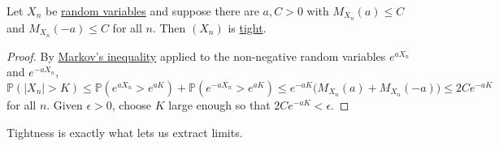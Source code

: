 	\begin{lemma}
	  \label{thm:bounded-mgf-implies-tight}
		Let $X_n$ be \hyperref[def:random-variable]{random variables} and suppose there are $a, C > 0$ with $M_{X_n} (a) \leq C$ and $M_{X_n} (-a) \leq C$ for all $n$. Then $(X_n)$ is \hyperref[def:tight-sequence-of-random-variables]{tight}. 
	\end{lemma}
	\begin{proof}
		By \hyperref[thm:markovs-inequality]{Markov's inequality} applied to the non-negative random variables $e^{a X_n}$ and $e^{-a X_n}$, 
		\begin{equation}
			\mathbb{P}(|X_n| > K) \leq \mathbb{P}(e^{a X_n} > e^{a K}) + \mathbb{P}(e^{-a X_n} > e^{a K}) \leq e^{-a K} \big( M_{X_n} (a) + M_{X_n} (-a) \big) \leq 2 C e^{-a K}
		\end{equation}
		for all $n$. Given $\epsilon > 0$, choose $K$ large enough so that $2 C e^{-a K} < \epsilon$. 
	\end{proof}

	Tightness is exactly what lets us extract limits. 

